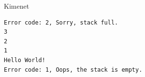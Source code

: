 \documentclass[usenames,dvipsnames,aspectratio=169]{beamer}
\begin{document}
\begin{frame}
    \begin{exampleblock}{}
        
    \end{exampleblock}
\end{frame}

\begin{frame}
    \begin{exampleblock}{}
        \footnotesize
        
    \end{exampleblock}
\end{frame}

\begin{frame}
    \begin{exampleblock}{}
        \small
        
    \end{exampleblock}
\end{frame}

\begin{frame}[fragile]
    \begin{block}{Kimenet}
        \vspace{-.45cm}
        \small
        \begin{verbatim}
Error code: 2, Sorry, stack full.
3
2
1
Hello World!
Error code: 1, Oops, the stack is empty.
\end{verbatim}
    \vspace{-.45cm}
    \end{block}
\end{frame}
\end{document}
